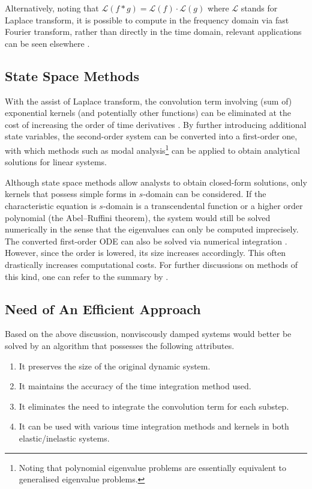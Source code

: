 Alternatively, noting that $\mathcal{L}\left(f*g\right)=\mathcal{L}\left(f\right)\cdot\mathcal{L}\left(g\right)$ where $\mathcal{L}$ stands for Laplace transform, it is possible to compute  in the frequency domain via fast Fourier transform, rather than directly in the time domain, relevant applications can be seen elsewhere \citep{Pan2013,Zhao2019}.
\subsection{State Space Methods}
With the assist of Laplace transform, the convolution term involving (sum of) exponential kernels (and potentially other functions) can be eliminated at the cost of increasing the order of time derivatives \citep[see, e.g.,][]{Wu2019}. By further introducing additional state variables, the second-order system  can be converted into a first-order one, with which methods such as modal analysis\footnote{Noting that polynomial eigenvalue problems are essentially equivalent to generalised eigenvalue problems.} can be applied to obtain analytical solutions for linear systems.

Although state space methods allow analysts to obtain closed-form solutions, only kernels that possess simple forms in $s$-domain can be considered. If the characteristic equation is $s$-domain is a transcendental function or a higher order polynomial (the Abel--Ruffini theorem), the system would still be solved numerically in the sense that the eigenvalues can only be computed imprecisely. The converted first-order ODE can also be solved via numerical integration \citep{Adhikari2004}. However, since the order is lowered, its size increases accordingly. This often drastically increases computational costs. For further discussions on methods of this kind, one can refer to the summary by \citet[][\S~1.3.1]{Adhikari2014}.
\subsection{Need of An Efficient Approach}
Based on the above discussion, nonviscously damped systems would better be solved by an algorithm that possesses the following attributes.
\begin{Objective}
\begin{enumerate}
\item It preserves the size of the original dynamic system.
\item It maintains the accuracy of the time integration method used.
\item It eliminates the need to integrate the convolution term for each substep.
\item It can be used with various time integration methods and kernels in both elastic/inelastic systems.
\end{enumerate}
\end{Objective}


